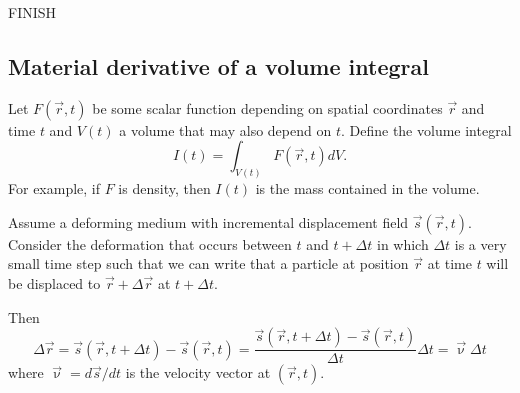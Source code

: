 FINISH

\subsection{Material derivative of a volume integral \label{app:matdervi}} 


Let $F(\vec{r},t)$ be some scalar function depending on spatial coordinates $\vec{r}$ and time $t$ and
$V(t)$ a volume that may also depend on $t$. Define the volume integral 
\[
I(t) = \int_{V(t)} F(\vec{r},t) dV.
\] 
For example, if $F$ is density, then $I(t)$ is the mass contained in the volume.

Assume a deforming medium with incremental displacement field $\vec{s}(\vec{r},t)$. 
Consider the
deformation that occurs between $t$ and $t+\Delta t$ in which $\Delta t$ is a very small time step such
that we can write that a particle at position $\vec{r}$ at time $t$ will be displaced to 
$\vec{r} + \Delta \vec{r}$ at $t + \Delta t$.

Then
\[
\Delta \vec{r} 
= \vec{s}(\vec{r},t+\Delta t)-\vec{s}(\vec{r},t)
= \frac{\vec{s}(\vec{r},t+\Delta t)-\vec{s}(\vec{r},t)}{\Delta t} \Delta t
= \vec{\upnu} \Delta t
\]
where 
$\vec{\upnu}=d\vec{s}/dt$ is the velocity vector at $(\vec{r},t)$.


